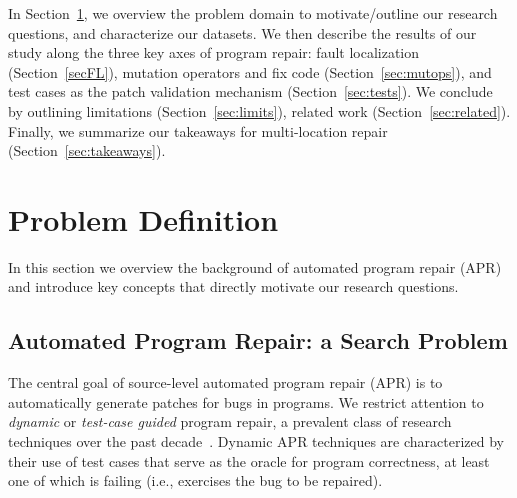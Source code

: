 \documentclass[10pt, conference]{IEEEtran}
\begin{document}
In Section~\ref{sec:background}, we overview the problem domain to
motivate/outline our research questions, and characterize our datasets.
We then describe the results of our study along the
three key axes of program repair: fault localization (Section~\ref{secFL}),
mutation operators and fix code (Section~\ref{sec:mutops}), and test cases as
the patch validation mechanism (Section~\ref{sec:tests}).  We conclude by
outlining limitations (Section~\ref{sec:limits}), related work
(Section~\ref{sec:related}).  Finally, 
we summarize our takeaways for 
multi-location repair (Section~\ref{sec:takeaways}).

\section{Problem Definition}
\label{sec:background}

In this section we overview the background of automated program repair (APR) and
introduce key concepts that directly motivate our research questions.

\subsection{Automated Program Repair: a Search Problem}

The central goal of source-level automated program repair (APR) is to
automatically generate patches for bugs in programs. We restrict attention to
\emph{dynamic} or \emph{test-case guided} program repair, a prevalent class of
research techniques over the past decade~\cite{cacm19}.  Dynamic APR techniques
are characterized by their use of test cases that serve as the oracle for
program correctness, at least one of which is failing (i.e., exercises the bug
to be repaired).
\end{document}
